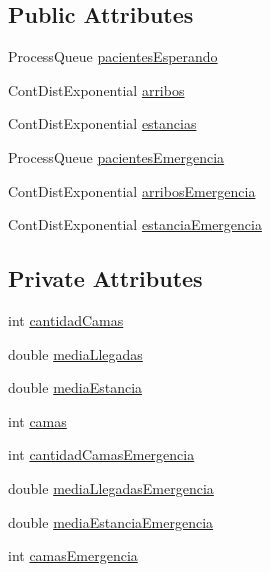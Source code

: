 \subsection*{Public Attributes}
\begin{DoxyCompactItemize}
\item 
Process\-Queue \hyperlink{class_modelo_hospital_ad0cbe7f57f1733551b2bb33e1a90499a}{pacientes\-Esperando}
\item 
Cont\-Dist\-Exponential \hyperlink{class_modelo_hospital_aa376037c68b7415b56f0f677d74c16dd}{arribos}
\item 
Cont\-Dist\-Exponential \hyperlink{class_modelo_hospital_ac2594297170d65562215179eae38e2a1}{estancias}
\item 
Process\-Queue \hyperlink{class_modelo_hospital_a6a2e3dd496eac896ac92232d283db1be}{pacientes\-Emergencia}
\item 
Cont\-Dist\-Exponential \hyperlink{class_modelo_hospital_aa508c4132ba981b9520f843dc24561e4}{arribos\-Emergencia}
\item 
Cont\-Dist\-Exponential \hyperlink{class_modelo_hospital_a6c710d90f7333974d066f761b23688c1}{estancia\-Emergencia}
\end{DoxyCompactItemize}
\subsection*{Private Attributes}
\begin{DoxyCompactItemize}
\item 
int \hyperlink{class_modelo_hospital_a7976b96ea2a7a95f28b9ae175201b54d}{cantidad\-Camas}
\item 
double \hyperlink{class_modelo_hospital_a01a673aabc00aff4fa4efecf10e1c628}{media\-Llegadas}
\item 
double \hyperlink{class_modelo_hospital_a10dea35940463cb2f7b34e333ac799b9}{media\-Estancia}
\item 
int \hyperlink{class_modelo_hospital_abe9d4c46824ac9a664db21b4d2482f5b}{camas}
\item 
int \hyperlink{class_modelo_hospital_a399104f28dff59862c839e754af5858b}{cantidad\-Camas\-Emergencia}
\item 
double \hyperlink{class_modelo_hospital_a8c82045a833cf70bce0e81b87e77d91a}{media\-Llegadas\-Emergencia}
\item 
double \hyperlink{class_modelo_hospital_a251f7d9ddab04b2fb1e9ff101b3a3354}{media\-Estancia\-Emergencia}
\item 
int \hyperlink{class_modelo_hospital_ad9062f6156719fa8052f4cafe877f8b0}{camas\-Emergencia}
\end{DoxyCompactItemize}


